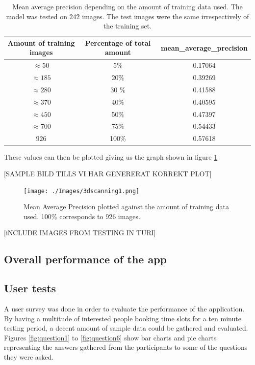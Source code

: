 \begin{table}[h]
\centering
\begin{tabular}{ |c|c|c| } 
 \hline
 Amount of training images & Percentage of total amount & mean\_average\_precision  \\ 
 \hline
 $\approx 50$& 5\% & 0.17064 \\
 \hline
 $\approx 185$& 20\% & 0.39269 \\
 \hline
$\approx 280$ &  30 \% & 0.41588 \\
 \hline
 $\approx 370$& 40\% & 0.40595 \\
 \hline
 $\approx 450$& 50\% & 0.47397 \\
\hline
 $\approx 700$& 75\% & 0.54433 \\
 \hline
$926$ & 100\% & 0.57618 \\
 \hline
\end{tabular}
\caption{Mean average precision depending on the amount of training data used. The model was tested on 242 images. The test images were the same irrespectively of the training set.}
\label{table:mAP}
\end{table}

These values can then be plotted giving us the graph shown in figure \ref{fig:mAPResult}

[SAMPLE BILD TILLS VI HAR GENERERAT KORREKT PLOT]
\begin{figure}[h]
\begin{center}
\texttt{[image: ./Images/3dscanning1.png]}
\caption{Mean Average Precision plotted against the amount of training data used. 100\% corresponds to 926 images.}
\label{fig:mAPResult}
\end{center}
\end{figure}

[iNCLUDE IMAGES FROM TESTING  IN TURI]


\subsection{Overall performance of the app}


\subsection{User tests}

A user survey was done in order to evaluate the performance of the application. By having a multitude of interested people booking time slots for a ten minute testing period, a decent amount of sample data could be gathered and evaluated. Figures \ref{fig:question1} to \ref{fig:question6} show bar charts and pie charts representing the answers gathered from the participants to some of the questions they were asked. 

